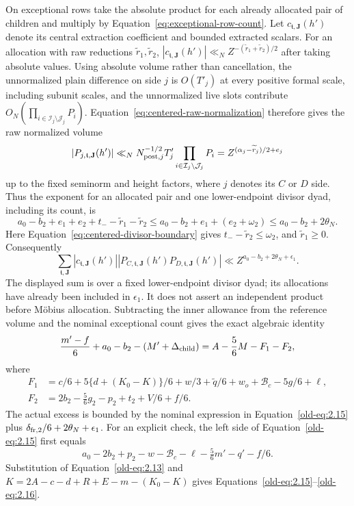 \documentclass[11pt,a4paper]{article}
\numberwithin{equation}{section}
\numberwithin{figure}{section}
\theoremstyle{definition}
\theoremstyle{remark}
\begin{document}
On exceptional rows take the absolute product for each already
allocated pair of children and multiply by
Equation~\eqref{eq:exceptional-row-count}.  Let
\(c_{\mathfrak t,\mathbf J}(h')\) denote its central extraction
coefficient and bounded extracted scalars.  For an allocation with raw
reductions \(\widetilde r_1,\widetilde r_2\),
\(|c_{\mathfrak t,\mathbf J}(h')|\ll_N
 Z^{-(\widetilde r_1+\widetilde r_2)/2}\) after taking absolute values.
Using absolute volume rather than cancellation, the unnormalized plain
difference on side \(j\) is \(O(T'_j)\) at every positive formal scale,
including subunit scales, and the unnormalized live slots contribute
\(O_N(\prod_{i\in\mathcal I_j\setminus\mathcal J_j}P_i)\).
Equation~\eqref{eq:centered-raw-normalization} therefore gives the raw
normalized volume
\[
 |P_{j,\mathfrak t,\mathbf J}(h')|
 \ll_N N_{{\rm post},j}^{-1/2}T'_j
             \prod_{i\in\mathcal I_j\setminus\mathcal J_j}P_i
 =Z^{(\alpha_j-\widetilde r_j)/2+e_j}
\]
up to the fixed seminorm and height factors, where \(j\) denotes its
\(C\) or \(D\) side.  Thus the exponent for an allocated pair and one
lower-endpoint divisor dyad, including its count, is
\[
 a_0-b_2+e_1+e_2+t_- -\widetilde r_1-\widetilde r_2
 \le a_0-b_2+e_1+(e_2+\omega_2)
 \le a_0-b_2+2\theta_N.
\]
Here Equation~\eqref{eq:centered-divisor-boundary} gives
\(t_- -\widetilde r_2\le\omega_2\), and \(\widetilde r_1\ge0\).
Consequently
\[
 \sum_{\mathfrak t,\mathbf J}
 |c_{\mathfrak t,\mathbf J}(h')|
 |P_{C,\mathfrak t,\mathbf J}(h')
       P_{D,\mathfrak t,\mathbf J}(h')|
 \ll Z^{a_0-b_2+2\theta_N+\epsilon_1}.
\]
The displayed sum is over a fixed lower-endpoint divisor dyad; its
allocations have already been included in
\(\epsilon_1\).  It does not assert an independent product before
M\"obius allocation.  Subtracting the inner allowance from the
reference volume and the nominal exceptional count gives the exact
algebraic identity
\begin{equation}
 \frac{m'-f}{6}+a_0-b_2-(M'+\Delta_{\rm child})
 =A-\frac56M-F_1-F_2,
 \label{old-eq:2.15}
\end{equation}
where
\begin{equation}
 \begin{aligned}
 F_1&=c/6+5\{d+(K_0-K)\}/6+w/3+\widetilde q/6
       +w_o+\mathcal B_c-5g/6+\ell,\\
 F_2&=2b_2-\tfrac56g_2-p_2+t_2+V/6+f/6.
 \end{aligned}
 \label{old-eq:2.16}
\end{equation}
The actual excess is bounded by the nominal expression in
Equation~\eqref{old-eq:2.15} plus
\(\delta_{{\rm fr},2}/6+2\theta_N+\epsilon_1\).
For an explicit check, the left side of
Equation~\eqref{old-eq:2.15} first equals
\[
 a_0-2b_2+p_2-w-\mathcal B_c-\ell
       -\tfrac56m'-q'-f/6.
\]
Substitution of Equation~\eqref{old-eq:2.13} and
\(K=2A-c-d+R+E-m-(K_0-K)\) gives
Equations~\eqref{old-eq:2.15}--\eqref{old-eq:2.16}.
\end{document}
